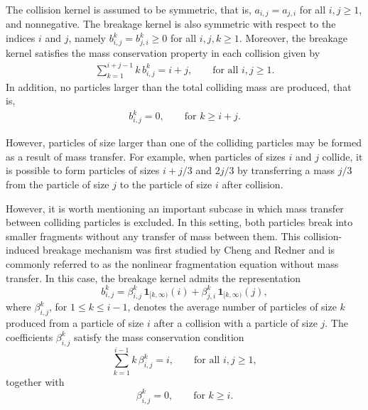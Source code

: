 \documentclass[a4paper,12pt,reqno]{amsart}
\theoremstyle{plain}
\numberwithin{equation}{section}
\begin{document}
	The collision kernel is assumed to be symmetric, that is,
	$a_{i,j} = a_{j,i}$ for all $i,j \ge 1$, and nonnegative.
	The breakage kernel is also symmetric with respect to the indices $i$ and $j$,
	namely $b_{i,j}^k = b_{j,i}^k \ge 0$ for all $i,j,k \ge 1$.
	Moreover, the breakage kernel satisfies the mass conservation property in each collision given by
	\begin{align}
		\sum_{k=1}^{i+j-1} k\, b_{i,j}^k = i+j, \qquad \text{for all } i,j \ge 1. \label{local mass conservation}
	\end{align}
	In addition, no particles larger than the total colliding mass are produced, that is,
	\begin{align}
		b_{i,j}^k = 0, \qquad \text{for } k \ge i+j. \label{zero value of b}
	\end{align}
	
	
	However, particles of size larger than one of the colliding particles may be
	formed as a result of mass transfer.
	For example, when particles of sizes $i$ and $j$ collide, it is possible to form
	particles of sizes $i + j/3$ and $2j/3$ by transferring a mass
	$j/3$ from the particle of size $j$ to the particle of size $i$ after
	collision.
	
	However, it is worth mentioning an important subcase in which mass transfer
	between colliding particles is excluded.
	In this setting, both particles break into smaller fragments without any transfer
	of mass between them.
	This collision-induced breakage mechanism was first studied by Cheng and Redner \cite{cheng1988, cheng1990} and is commonly referred to as the nonlinear fragmentation equation without mass transfer. In this case, the breakage kernel admits the representation
	\[
	b_{i,j}^k
	=
	\beta_{i,j}^k \, \mathbf{1}_{[k,\infty)}(i)
	+
	\beta_{j,i}^k \, \mathbf{1}_{[k,\infty)}(j),
	\]
	where $\beta_{i,j}^k$, for $1 \le k \le i-1$, denotes the average number of
	particles of size $k$ produced from a particle of size $i$ after a collision with
	a particle of size $j$.
	The coefficients $\beta_{i,j}^k$ satisfy the mass conservation condition
	\[
	\sum_{k=1}^{i-1} k\, \beta_{i,j}^k = i, \qquad \text{for all } i,j \ge 1,
	\]
	together with
	\[
	\beta_{i,j}^k = 0, \qquad \text{for } k \ge i.
	\]
	
\end{document}
